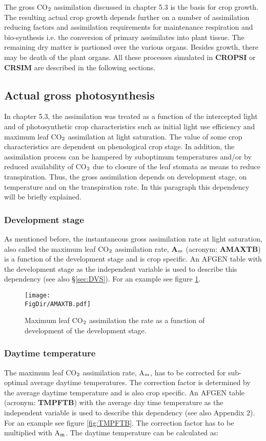 The gross CO$_{{\rm 2}}$ assimilation discussed in chapter 5.3 is the basis for crop growth. The
resulting actual crop growth depends further on a number of assimilation reducing factors
and assimilation requirements for maintenance respiration and bio-synthesis i.e. the
conversion of primary assimilates into plant tissue. The remaining dry matter is partioned
over the various organs. Besides growth, there may be death of the plant organs. All
these processes simulated in {\bf CROPSI} or {\bf CRSIM} are described in the following sections.

\subsection{Actual gross photosynthesis}

In chapter 5.3, the assimilation was treated as a function of the intercepted light and of
photosynthetic crop characteristics such as initial light use efficiency and maximum leaf
CO$_{{\rm 2}}$ assimilation at light saturation. The value of some crop characteristics are dependent
on phenological crop stage. In addition, the assimilation process can be hampered by
suboptimum temperatures and/or by reduced availability of CO$_{{\rm 2}}$ due to closure of the leaf
stomata as means to reduce transpiration. Thus, the gross assimilation depends on
development stage, on temperature and on the transpiration rate. In this paragraph this
dependency will be briefly explained.

\subsubsection{Development stage}
As mentioned before, the instantaneous gross assimilation rate at light saturation, also
called the maximum leaf CO$_{{\rm 2}}$ assimilation rate, {\bf A$_{{\rm m}}$} (acronym: 
{\bf AMAXTB}) is a function of
the development stage and is crop specific. An AFGEN table with the development stage
as the independent variable is used to describe this dependency (see also \S \ref{sec:DVS}). For an
example see figure \ref{fig:AMAXTB}.

\begin{figure}[p]
\centering
\texttt{[image: \\FigDir/AMAXTB.pdf]}
\caption{Maximum leaf CO$_{{\rm 2}}$ assimilation the rate as a function of development of
the development stage.}
\label{fig:AMAXTB}
\end{figure}

\subsubsection{Daytime temperature}
The maximum leaf CO$_{{\rm 2}}$ assimilation rate, A$_{{\rm m}}$, has to be corrected for sub-optimal average
daytime temperatures. The correction factor is determined by the average daytime
temperature and is also crop specific. An AFGEN table (acronym: {\bf TMPFTB}) with the
average day time temperature as the independent variable is used to describe this
dependency (see also Appendix 2). For an example see figure \ref{fig:TMPFTB}. 
The correction factor has to be multiplied with A$_{{\rm m}}$. The daytime temperature can be
calculated as:

